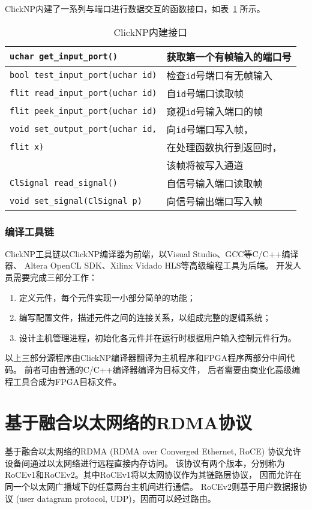 ClickNP内建了一系列与端口进行数据交互的函数接口，如表~\ref{tab:operations} 所示。
\begin{table}[htbp]
\centering
\caption{ClickNP内建接口}\label{tab:operations}
\begin{tabular}{l|l}
\toprule
\lstinline$uchar get_input_port()$         & 获取第一个有帧输入的端口号 \\
\midrule
\lstinline$bool test_input_port(uchar id)$ & 检查\lstinline$id$号端口有无帧输入 \\
\midrule
\lstinline$flit read_input_port(uchar id)$ & 自\lstinline$id$号端口读取帧 \\
\midrule
\lstinline$flit peek_input_port(uchar id)$ & 窥视\lstinline$id$号输入端口的帧 \\
\midrule
\lstinline$void set_output_port(uchar id,$ & 向\lstinline$id$号端口写入帧， \\
\lstinline$flit x)$                        & 在处理函数执行到返回时， \\
                                           & 该帧将被写入通道 \\
\midrule
\lstinline$ClSignal read_signal()$         & 自信号输入端口读取帧 \\
\midrule
\lstinline$void set_signal(ClSignal p)$    & 向信号输出端口写入帧 \\
\bottomrule
\end{tabular}
\end{table}

\subsubsection{编译工具链}
ClickNP工具链以ClickNP编译器为前端，以Visual Studio、GCC等C/C++编译器、
Altera OpenCL SDK、Xilinx Vidado HLS等高级编程工具为后端。
开发人员需要完成三部分工作：
\begin{enumerate}
\item 定义元件，每个元件实现一小部分简单的功能；
\item 编写配置文件，描述元件之间的连接关系，以组成完整的逻辑系统；
\item 设计主机管理进程，初始化各元件并在运行时根据用户输入控制元件行为。
\end{enumerate}

以上三部分源程序由ClickNP编译器翻译为主机程序和FPGA程序两部分中间代码。
前者可由普通的C/C++编译器编译为目标文件，
后者需要由商业化高级编程工具合成为FPGA目标文件。



\section{基于融合以太网络的RDMA协议}
基于融合以太网络的RDMA (RDMA over Converged Ethernet, RoCE) 协议允许设备间通过以太网络进行远程直接内存访问。
该协议有两个版本，分别称为RoCEv1和RoCEv2。其中RoCEv1将以太网协议作为其链路层协议，
因而允许在同一个以太网广播域下的任意两台主机间进行通信\cite{a16}。
RoCEv2则基于用户数据报协议 (user datagram protocol, UDP)，因而可以经过路由\cite{a17, considerations, storage}。

